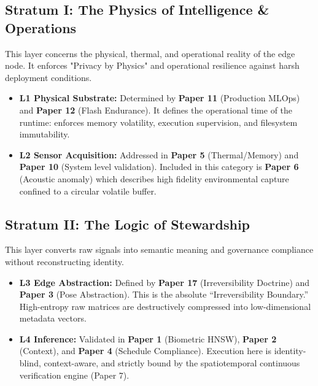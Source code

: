 \documentclass[conference]{IEEEtran}
\begin{document}
\subsection{Stratum I: The Physics of Intelligence \& Operations}
This layer concerns the physical, thermal, and operational reality of the edge node. It enforces "Privacy by Physics" and operational resilience against harsh deployment conditions.
\begin{itemize}
    \item \textbf{L1 Physical Substrate:} Determined by \textbf{Paper 11} (Production MLOps) and \textbf{Paper 12} (Flash Endurance). It defines the operational time of the runtime: enforces memory volatility, execution supervision, and filesystem immutability. 
    \item \textbf{L2 Sensor Acquisition:} Addressed in \textbf{Paper 5} (Thermal/Memory) and \textbf{Paper 10} (System level validation). Included in this category is \textbf{Paper 6} (Acoustic anomaly) which describes high fidelity environmental capture confined to a circular volatile buffer.
\end{itemize}

\subsection{Stratum II: The Logic of Stewardship}
This layer converts raw signals into semantic meaning and governance compliance without reconstructing identity. 
\begin{itemize}
    \item \textbf{L3 Edge Abstraction:} Defined by \textbf{Paper 17} (Irreversibility Doctrine) and \textbf{Paper 3} (Pose Abstraction). This is the absolute ``Irreversibility Boundary.'' High-entropy raw matrices are destructively compressed into low-dimensional metadata vectors.
    \item \textbf{L4 Inference:} Validated in \textbf{Paper 1} (Biometric HNSW), \textbf{Paper 2} (Context), and \textbf{Paper 4} (Schedule Compliance). Execution here is identity-blind, context-aware, and strictly bound by the spatiotemporal continuous verification engine (Paper 7).
\end{itemize}
\end{document}
